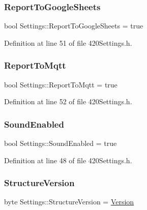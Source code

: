 \mbox{\label{struct_settings_a950aa2fd9963a7193b6aecc16b1b4526}} 
\subsubsection{\texorpdfstring{ReportToGoogleSheets}{ReportToGoogleSheets}}
{\footnotesize\ttfamily bool Settings\+::\+Report\+To\+Google\+Sheets = true}



Definition at line 51 of file 420\+Settings.\+h.

\mbox{\label{struct_settings_a096bff8ddaf4783fb60a9c68ec2ae93d}} 
\subsubsection{\texorpdfstring{ReportToMqtt}{ReportToMqtt}}
{\footnotesize\ttfamily bool Settings\+::\+Report\+To\+Mqtt = true}



Definition at line 52 of file 420\+Settings.\+h.

\mbox{\label{struct_settings_a8783f1cddf80706f13662f13168c3dbe}} 
\subsubsection{\texorpdfstring{SoundEnabled}{SoundEnabled}}
{\footnotesize\ttfamily bool Settings\+::\+Sound\+Enabled = true}



Definition at line 48 of file 420\+Settings.\+h.

\mbox{\label{struct_settings_a923d0e7c37322a666726a4ca40b14aad}} 
\subsubsection{\texorpdfstring{StructureVersion}{StructureVersion}}
{\footnotesize\ttfamily byte Settings\+::\+Structure\+Version = \mbox{\hyperlink{420_settings_8h_a90337a28eda4a299ae1c1953e4440674}{Version}}}



